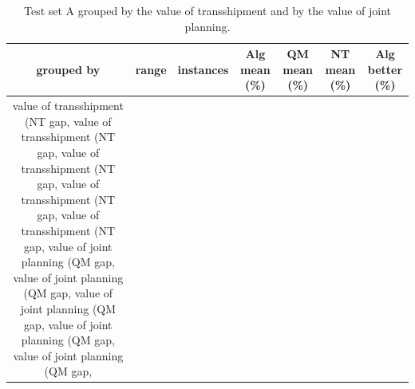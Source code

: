 \begin{table}[H]
\centering
\caption{Test set A grouped by the value of transshipment and by the value of joint planning.}
\label{tab:test3_A_value}
\begin{tabular}{ccccccc}
\toprule
grouped by & range & instances & Alg mean (\%) & QM mean (\%) & NT mean (\%) & Alg better (\%) \\
\midrule
value of transshipment (NT gap, %
value of transshipment (NT gap, %
value of transshipment (NT gap, %
value of transshipment (NT gap, %
value of transshipment (NT gap, %
value of joint planning (QM gap, %
value of joint planning (QM gap, %
value of joint planning (QM gap, %
value of joint planning (QM gap, %
value of joint planning (QM gap, %
\bottomrule
\end{tabular}
\end{table}